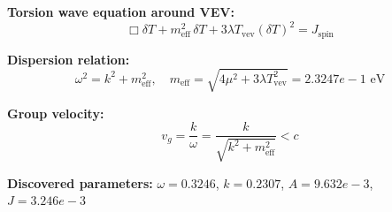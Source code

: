 
\textbf{Torsion wave equation around VEV:}
\begin{equation}
  \Box \delta T + m_{\text{eff}}^2 \, \delta T + 3\lambda T_{\text{vev}} (\delta T)^2 = J_{\text{spin}}
\end{equation}

\textbf{Dispersion relation:}
\begin{equation}
  \omega^2 = k^2 + m_{\text{eff}}^2, \quad
  m_{\text{eff}} = \sqrt{4\mu^2 + 3\lambda T_{\text{vev}}^2} = 2.3247e-1 \text{ eV}
\end{equation}

\textbf{Group velocity:}
\begin{equation}
  v_g = \frac{k}{\omega} = \frac{k}{\sqrt{k^2 + m_{\text{eff}}^2}} < c
\end{equation}

\textbf{Discovered parameters:}
$\omega = 0.3246$, \quad
$k = 0.2307$, \quad
$A = 9.632e-3$, \quad
$J = 3.246e-3$